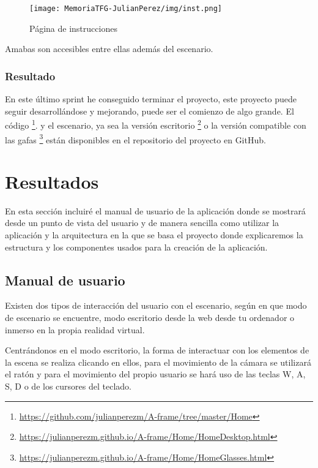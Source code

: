 \documentclass[a4paper, 12pt]{book}
\begin{document}
\begin{figure}[H]
  \centering
  \texttt{[image: MemoriaTFG-JulianPerez/img/inst.png]}
  \caption{Página de instrucciones}\label{home}
\end{figure}

Amabas son accesibles entre ellas además del escenario.

\subsection{Resultado}

En este último sprint he conseguido terminar el proyecto, este proyecto puede seguir desarrollándose y mejorando, puede ser el comienzo de algo grande. El código \footnote{\url{https://github.com/julianperezm/A-frame/tree/master/Home}}.  y el escenario, ya sea la versión escritorio \footnote{\url{https://julianperezm.github.io/A-frame/Home/HomeDesktop.html}} o la versión compatible con las gafas \footnote{\url{https://julianperezm.github.io/A-frame/Home/HomeGlasses.html}} están disponibles en el repositorio del proyecto en GitHub.


\cleardoublepage
\chapter{Resultados}

En esta sección incluiré el manual de usuario de la aplicación donde se mostrará  desde un punto de vista del usuario y de  manera sencilla como utilizar la aplicación y la arquitectura en la que se basa el proyecto donde explicaremos la estructura y los componentes usados para la creación de la aplicación.

\section{Manual de usuario} 
\label{sec:manual de usuario}

Existen dos tipos de interacción del usuario con el escenario, según en que modo de escenario se encuentre, modo escritorio desde la web desde tu ordenador  o inmerso en la propia realidad virtual.

Centrándonos en el modo escritorio, la forma de interactuar con los elementos de la escena se realiza clicando en ellos, para el movimiento de la cámara se utilizará el ratón y para el movimiento del propio usuario se hará uso de las teclas W, A, S, D o de los cursores del teclado. 
\end{document}
